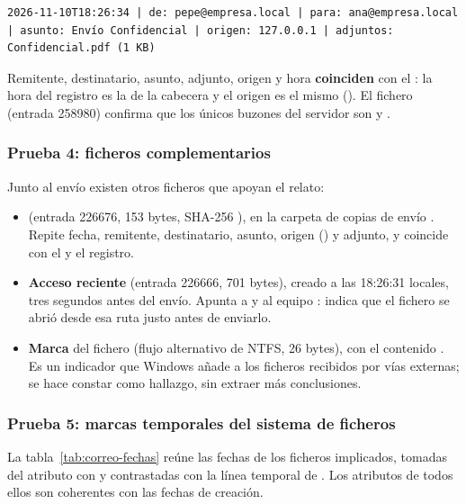 \begin{lstlisting}[style=terminal,basicstyle=\ttfamily\footnotesize,breaklines=true]
2026-11-10T18:26:34 | de: pepe@empresa.local | para: ana@empresa.local | asunto: Envío Confidencial | origen: 127.0.0.1 | adjuntos: Confidencial.pdf (1 KB)
\end{lstlisting}

Remitente, destinatario, asunto, adjunto, origen y hora \textbf{coinciden} con
el : la hora del registro es la de la cabecera  y el origen
es el mismo (). El fichero  (entrada 258980)
confirma que los únicos buzones del servidor son  y .

\subsubsection{Prueba 4: ficheros complementarios}
Junto al envío existen otros ficheros que apoyan el relato:

\begin{itemize}
  \item \textbf{} (entrada 226676, 153 bytes, SHA-256
        ), en la carpeta de copias de envío
        . Repite fecha,
        remitente, destinatario, asunto, origen () y adjunto,
        y coincide con el  y el registro.
  \item \textbf{Acceso reciente}  (entrada
        226666, 701 bytes), creado a las 18:26:31 locales, tres segundos antes
        del envío. Apunta a  y al equipo
        : indica que el fichero se abrió desde esa ruta
        justo antes de enviarlo.
  \item \textbf{Marca } del fichero
         (flujo alternativo de NTFS,
        26 bytes), con el contenido . Es un
        indicador que Windows añade a los ficheros recibidos por vías
        externas; se hace constar como hallazgo, sin extraer más conclusiones.
\end{itemize}

\subsubsection{Prueba 5: marcas temporales del sistema de ficheros}
La tabla~\ref{tab:correo-fechas} reúne las fechas de los ficheros implicados,
tomadas del atributo  con  y
contrastadas con la línea temporal de . Los atributos
 de todos ellos son coherentes con las fechas de creación.

